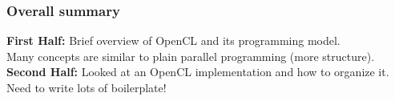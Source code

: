 \begin{frame}
  \frametitle{Overall summary}


    {\bf First Half:} Brief overview of OpenCL and its programming model.\\[1em]

    Many concepts are similar to plain parallel programming (more structure).\\[1em]

    {\bf Second Half:} Looked at an OpenCL implementation and how to organize it.\\[1em]
    Need to write lots of boilerplate!

\end{frame}



